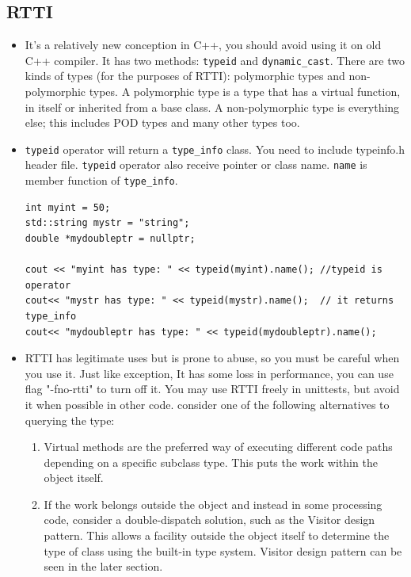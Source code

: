 \documentclass[a4paper,11pt,twoside]{book}
\begin{document}
\subsection{RTTI}
\begin{itemize}
	\item It's a relatively new conception in C++, you should avoid using it on old C++ compiler. It has two methods: \texttt{typeid} and \texttt{dynamic\_cast}. There are two kinds of types (for the purposes of RTTI): polymorphic types and non-polymorphic types. A polymorphic type is a type that has a virtual function, in itself or inherited from a base class. A non-polymorphic type is everything else; this includes POD types and many other types too.
	
	\item \texttt{typeid} operator will return a \texttt{type\_info} class.  You need to include typeinfo.h header file. \texttt{typeid} operator also receive pointer or class name. \texttt{name} is member function of \texttt{type\_info}.
	
\begin{lstlisting}
int myint = 50;
std::string mystr = "string";
double *mydoubleptr = nullptr;

cout << "myint has type: " << typeid(myint).name(); //typeid is operator
cout<< "mystr has type: " << typeid(mystr).name();  // it returns type_info
cout<< "mydoubleptr has type: " << typeid(mydoubleptr).name(); 	
\end{lstlisting}	
	
	\item RTTI has legitimate uses but is prone to abuse, so you must be careful when you use it. Just like exception, It has some loss in performance, you can use flag "-fno-rtti" to turn off it. You may use RTTI freely in unittests, but avoid it when possible in other code. consider one of the following alternatives to querying the type:
	\begin{enumerate}
		\item Virtual methods are the preferred way of executing different code paths depending on a specific subclass type. This puts the work within the object itself.
		
		\item If the work belongs outside the object and instead in some processing code, consider a double-dispatch solution, such as the Visitor design pattern. This allows a facility outside the object itself to determine the type of class using the built-in type system. Visitor design pattern can be seen in the later section.
	\end{enumerate}
\end{itemize}
\end{document}
